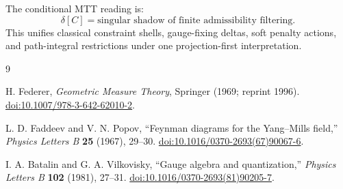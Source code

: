 \documentclass[11pt]{article}
\begin{document}
The conditional MTT reading is:
\[
\boxed{
\delta[C]=\text{singular shadow of finite admissibility filtering}.
}
\]
This unifies classical constraint shells, gauge-fixing deltas, soft penalty actions, and
path-integral restrictions under one projection-first interpretation.

\begin{thebibliography}{9}

H. Federer,
\emph{Geometric Measure Theory},
Springer (1969; reprint 1996).
\href{https://doi.org/10.1007/978-3-642-62010-2}{doi:10.1007/978-3-642-62010-2}.

L. D. Faddeev and V. N. Popov,
``Feynman diagrams for the Yang--Mills field,''
\emph{Physics Letters B} \textbf{25} (1967), 29--30.
\href{https://doi.org/10.1016/0370-2693(67)90067-6}{doi:10.1016/0370-2693(67)90067-6}.

I. A. Batalin and G. A. Vilkovisky,
``Gauge algebra and quantization,''
\emph{Physics Letters B} \textbf{102} (1981), 27--31.
\href{https://doi.org/10.1016/0370-2693(81)90205-7}{doi:10.1016/0370-2693(81)90205-7}.

\end{thebibliography}
\end{document}
